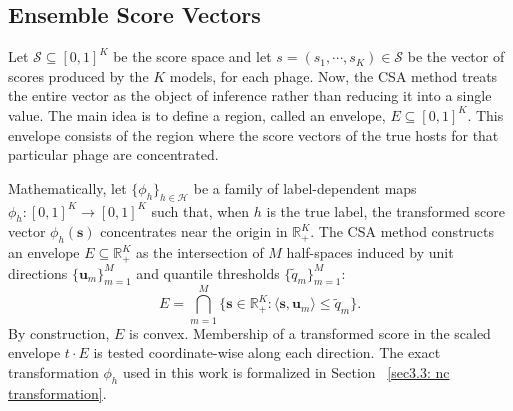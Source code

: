 \newpage
\subsection{Ensemble Score Vectors}
\label{sec2.4.1: ensemble score vectors}
Let $\mathcal{S} \subseteq [0, 1]^K$ be the score space and let $s = (s_1, \cdots, s_K) \in \mathcal{S}$ be 
the vector of scores produced by the $K$ models, for each phage. Now, the CSA method treats the entire vector as the 
object of inference rather than reducing it into a single value. The main idea is to define a region, called an envelope, 
$E \subseteq [0,1]^K$. This envelope consists of the region where the score vectors of the true hosts for that particular 
phage are concentrated.


Mathematically, let $\{\phi_h\}_{h\in\mathcal{H}}$ be a family of label-dependent maps 
$\phi_h: [0,1]^K \to [0,1]^K$ such that, when $h$ is the true label, the transformed 
score vector $\phi_h(\mathbf{s})$ concentrates near the origin in $\mathbb{R}^K_+$. 
The CSA method constructs an envelope $E \subseteq \mathbb{R}^K_+$ as the intersection 
of $M$ half-spaces induced by unit directions $\{\mathbf{u}_m\}_{m=1}^M$ and quantile 
thresholds $\{\tilde{q}_m\}_{m=1}^M$:
\begin{equation}
\label{eq: convex envelope}
E = \bigcap_{m=1}^{M} \bigl\{\mathbf{s} \in \mathbb{R}^K_+ : \langle \mathbf{s}, \mathbf{u}_m \rangle \leq \tilde{q}_m \bigr\}.
\end{equation}
By construction, $E$ is convex. Membership of a transformed score in the scaled envelope 
$t \cdot E$ is tested coordinate-wise along each direction. The exact transformation 
$\phi_h$ used in this work is formalized in Section~ \ref{sec3.3: nc transformation}.


